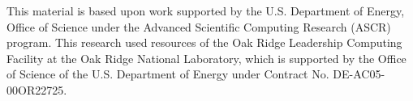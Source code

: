 This material is based upon work supported by the U.S. Department of Energy, Office of Science
under the Advanced Scientific Computing Research (ASCR) program. This research used resources of 
the Oak Ridge Leadership Computing Facility at the Oak Ridge National Laboratory, 
which is supported by the Office of Science of the U.S. Department of Energy under 
Contract No. DE-AC05-00OR22725.
